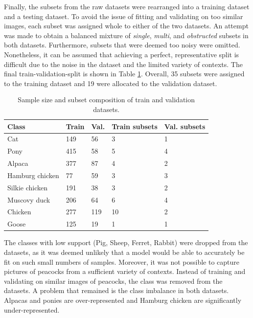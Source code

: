\documentclass{l4proj}
\begin{document}
Finally, the subsets from the raw datasets were rearranged into a training dataset and a testing dataset. To avoid the issue of fitting and validating on too similar images, each subset was assigned whole to either of the two datasets. An attempt was made to obtain a balanced mixture of \textit{single}, \textit{multi}, and \textit{obstructed} subsets in both datasets. Furthermore, subsets that were deemed too noisy were omitted. Nonetheless, it can be assumed that achieving a perfect, representative split is difficult due to the noise in the dataset and the limited variety of contexts. The final train-validation-split is shown in Table \ref{table:train_test_dataset}. Overall, 35 subsets were assigned to the training dataset and 19 were allocated to the validation dataset.

\begin{table}[ht]
  \centering
  \begin{tabular}{@{}lllll@{}}
    \toprule
    \textbf{Class}  & \textbf{Train } & \textbf{Val.} & \textbf{Train subsets}  & \textbf{Val. subsets} \\ \midrule
    Cat             & 149             & 56                  & 3                 & 1 \\
    Pony            & 415             & 58                  & 5                 & 4 \\
    Alpaca          & 377             & 87                  & 4                 & 2 \\
    Hamburg chicken & 77              & 59                  & 3                 & 3 \\
    Silkie chicken  & 191             & 38                  & 3                 & 2 \\
    Muscovy duck    & 206             & 64                  & 6                 & 4 \\
    Chicken         & 277             & 119                 & 10                & 2 \\
    Goose           & 125             & 19                  & 1                 & 1 \\ \bottomrule
  \end{tabular}
  \caption{Sample size and subset composition of train and validation datasets.}
  \label{table:train_test_dataset}
\end{table}

The classes with low support (Pig, Sheep, Ferret, Rabbit) were dropped from the datasets, as it was deemed unlikely that a model would be able to accurately be fit on such small numbers of samples. Moreover, it was not possible to capture pictures of peacocks from a sufficient variety of contexts. Instead of training and validating on similar images of peacocks, the class was removed from the datasets. A problem that remained is the class imbalance in both datasets. Alpacas and ponies are over-represented and Hamburg chicken are significantly under-represented.
\end{document}
